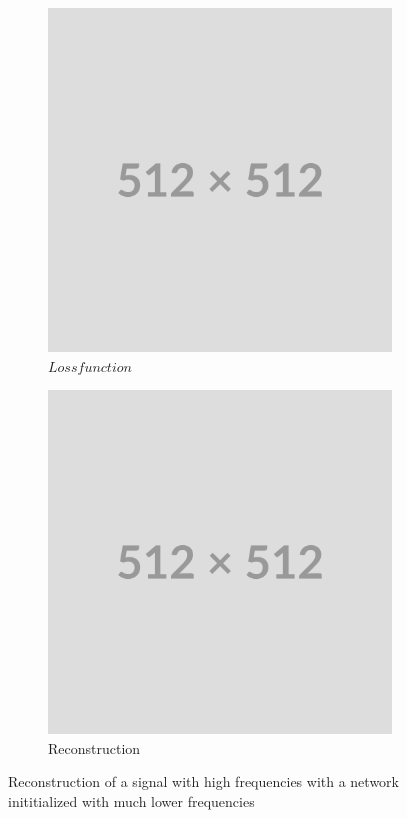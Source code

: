 \begin{figure}
    \centering
    \begin{subfigure}[b]{0.3\textwidth}
        \centering
        \includegraphics[width=\textwidth]{img/placeholder512.png}
        \caption{$Loss function$}
        \label{fig:diverging-loss}
    \end{subfigure}
    \begin{subfigure}[b]{0.3\textwidth}
        \centering
        \includegraphics[width=\textwidth]{img/placeholder512.png}
        \caption{Reconstruction}
        \label{fig:diverging-reconstruction}
    \end{subfigure}
    \caption{Reconstruction of a signal with high frequencies with a network inititialized with much lower frequencies}
    \label{f:diverging-omega0}
\end{figure}

